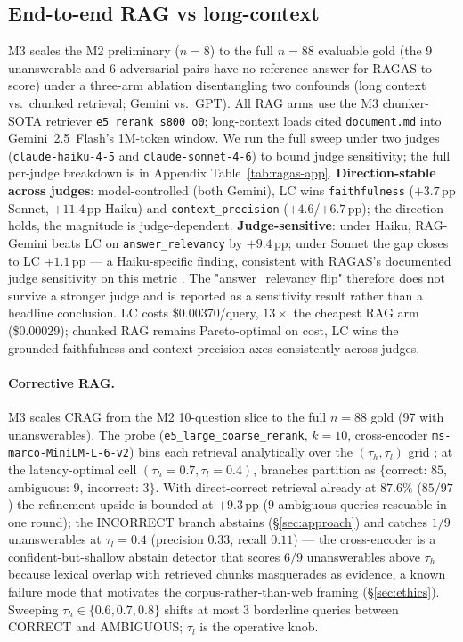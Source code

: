 \documentclass[11pt]{article}
\begin{document}
\subsection{End-to-end RAG vs long-context}
\label{sec:ragas}

M3 scales the M2 preliminary ($n{=}8$) to the full $n{=}88$ evaluable gold (the 9 unanswerable and 6 adversarial pairs have no reference answer for RAGAS to score) under a three-arm ablation disentangling two confounds (long context vs.\ chunked retrieval; Gemini vs.\ GPT). All RAG arms use the M3 chunker-SOTA retriever \texttt{e5\_rerank\_s800\_o0}; long-context loads cited \texttt{document.md} into Gemini~2.5~Flash's 1M-token window. We run the full sweep under two judges (\texttt{claude-haiku-4-5} and \texttt{claude-sonnet-4-6}) to bound judge sensitivity; the full per-judge breakdown is in Appendix Table~\ref{tab:ragas-app}. \textbf{Direction-stable across judges}: model-controlled (both Gemini), LC wins \texttt{faithfulness} ($+3.7$\,pp Sonnet, $+11.4$\,pp Haiku) and \texttt{context\_precision} ($+4.6$/$+6.7$\,pp); the direction holds, the magnitude is judge-dependent. \textbf{Judge-sensitive}: under Haiku, RAG-Gemini beats LC on \texttt{answer\_relevancy} by $+9.4$\,pp; under Sonnet the gap closes to LC $+1.1$\,pp --- a Haiku-specific finding, consistent with RAGAS's documented judge sensitivity on this metric \citep{es2024ragas}. The "answer\_relevancy flip" therefore does not survive a stronger judge and is reported as a sensitivity result rather than a headline conclusion. LC costs \$0.00370/query, $13\times$ the cheapest RAG arm (\$0.00029); chunked RAG remains Pareto-optimal on cost, LC wins the grounded-faithfulness and context-precision axes consistently across judges.

\paragraph{Corrective RAG.}\label{sec:crag} M3 scales CRAG \citep{yan2024corrective} from the M2 10-question slice to the full $n{=}88$ gold (97 with unanswerables). The probe (\texttt{e5\_large\_coarse\_rerank}, $k{=}10$, cross-encoder \texttt{ms-marco-MiniLM-L-6-v2}) bins each retrieval analytically over the $(\tau_h, \tau_l)$ grid \citep{yan2024corrective}; at the latency-optimal cell $(\tau_h{=}0.7, \tau_l{=}0.4)$, branches partition as $\{$correct: $85$, ambiguous: $9$, incorrect: $3\}$. With direct-correct retrieval already at $87.6\%$ ($85/97$) the refinement upside is bounded at $+9.3$\,pp ($9$ ambiguous queries rescuable in one round); the INCORRECT branch abstains (\S\ref{sec:approach}) and catches $1/9$ unanswerables at $\tau_l{=}0.4$ (precision $0.33$, recall $0.11$) --- the cross-encoder is a confident-but-shallow abstain detector that scores $6/9$ unanswerables above $\tau_h$ because lexical overlap with retrieved chunks masquerades as evidence, a known failure mode that motivates the corpus-rather-than-web framing (\S\ref{sec:ethics}). Sweeping $\tau_h \in \{0.6, 0.7, 0.8\}$ shifts at most $3$ borderline queries between CORRECT and AMBIGUOUS; $\tau_l$ is the operative knob.
\end{document}
